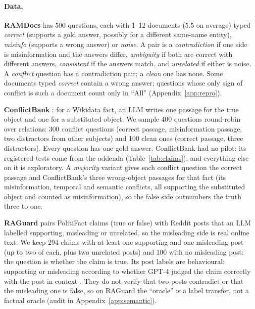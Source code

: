 \paragraph{Data.}
\textbf{RAMDocs} \citep{wang2025madam} has 500 questions, each with 1--12 documents (5.5 on average) typed
\emph{correct} (supports a gold answer, possibly for a different same-name entity), \emph{misinfo} (supports a wrong
answer) or \emph{noise}. A pair is a \emph{contradiction} if one side is misinformation and the answers differ,
\emph{ambiguity} if both are correct with different answers, \emph{consistent} if the answers match, and
\emph{unrelated} if either is noise. A \emph{conflict} question has a contradiction pair; a
\emph{clean} one has none. Some documents typed \emph{correct} contain a wrong answer; questions whose only sign of
conflict is such a document count only in ``All'' (Appendix~\ref{app:repro}).

\textbf{ConflictBank} \citep{su2024conflictbank}: for a Wikidata fact, an LLM writes one passage for the true
object and one for a substituted object. We sample 400 questions round-robin over relations: 300 conflict questions
(correct passage, misinformation passage, two distractors from other subjects) and 100 clean ones (correct passage,
three distractors). Every question has one gold answer. ConflictBank had no pilot: its registered tests come from the addenda (Table~\ref{tab:claims}), and everything else on it is exploratory. A
\emph{majority} variant gives each conflict question the correct passage and ConflictBank's three wrong-object
passages for that fact (its misinformation, temporal and semantic conflicts, all supporting the substituted object
and counted as misinformation), so the false side outnumbers the truth three to one.

\textbf{RAGuard} \citep{zeng2025raguard} pairs PolitiFact claims (true or false) with Reddit posts that an LLM
labelled supporting, misleading or unrelated, so the misleading side is real online text. We keep 294 claims with at
least one supporting and one misleading post (up to two of each, plus two unrelated posts) and 100 with no
misleading post; the question is whether the claim is true. Its post labels are behavioural: supporting or misleading according to whether GPT-4 judged the claim correctly with the post in context \citep[\S3.3]{zeng2025raguard}. They do not verify that two posts contradict or that the misleading one is false, so on RAGuard the ``oracle'' is a label transfer, not a factual oracle (audit in Appendix~\ref{app:semantic}).

